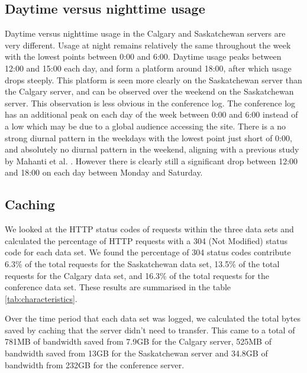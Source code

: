 \documentclass[10pt,conference]{IEEEtran}
\begin{document}
\subsection{Daytime versus nighttime usage} %
\label{sub:daytime_versus_nighttime_usage}
Daytime versus nighttime usage in the Calgary and Saskatchewan servers are very different. Usage at night remains relatively the same throughout the week with the lowest points between 0:00 and 6:00. Daytime usage peaks between 12:00 and 15:00 each day, and form a platform around 18:00, after which usage drops steeply. This platform is seen more clearly on the Saskatchewan server than the Calgary server, and can be observed over the weekend on the Saskatchewan server. This observation is less obvious in the conference log. The conference log has an additional peak on each day of the week between 0:00 and 6:00 instead of a low which may be due to a global audience accessing the site. There is a no strong diurnal pattern in the weekdays with the lowest point just short of 0:00, and absolutely no diurnal pattern in the weekend, aligning with a previous study by Mahanti et al. \cite{Mahanti_Wu}. However there is clearly still a significant drop between 12:00 and 18:00 on each day between Monday and Saturday. 

\subsection{Caching} %
\label{sub:caching}
We looked at the HTTP status codes of requests within the three data sets and calculated the percentage of HTTP requests with a 304 (Not Modified) status code for each data set. We found the percentage of 304 status codes contribute 6.3\% of the total requests for the Saskatchewan data set, 13.5\% of the total requests for the Calgary data set, and 16.3\% of the total requests for the conference data set. These results are summarised in the table \ref{tab:characteristics}.

Over the time period that each data set was logged, we calculated the total bytes saved by caching that the server didn't need to transfer. This came to a total of 781MB of bandwidth saved from 7.9GB for the Calgary server, 525MB of bandwidth saved from 13GB for the Saskatchewan server and 34.8GB of bandwidth from 232GB for the conference server.
\end{document}
